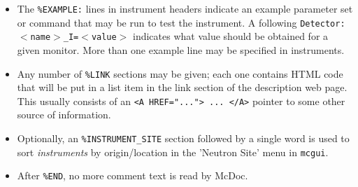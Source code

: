 \begin{itemize}
  \verb+<PRE>+\ldots\verb+</PRE>+, so that the line breaks in the source
  will be obeyed.
\item 
  \sloppy
  The \verb+%EXAMPLE:+
  lines in instrument headers indicate an example parameter set or command that may be
  run to test the instrument. A following \texttt{Detector: $<$name$>$\_I=$<$value$>$}
  indicates what value should be obtained for a given monitor. More than one example
  line may be specified in instruments.
\item
  Any number of \verb+%LINK+
  sections may be given; each one contains HTML code that will be put in
  a list item in the link section of the description web page. This
  usually consists of an \verb+<A HREF="..."> ... </A>+ pointer to some
  other source of information.
\item
  Optionally, an \verb+%INSTRUMENT_SITE+ section followed by a single word is used to sort \emph{instruments} by origin/location in the 'Neutron Site' menu in \verb+mcgui+.
\item  {}
  After \verb+%END+, no more comment text is read by McDoc.
\end{itemize}

